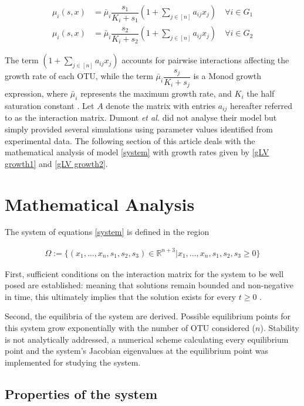 \documentclass[3p,times]{article}
\newcommand{\R}{\mathbb{R}}
\begin{document}
\begin{align}
\label{gLV growth1}\mu_i(s,x) &= \bar{\mu}_i \dfrac{s_1}{K_i + s_1}\left(1+\sum \limits_{j\in [n]} a_{ij} x_{j} \right) \quad \forall i \in G_1 \\
\label{gLV growth2}\mu_i(s,x) &= \bar{\mu}_i \dfrac{s_2}{K_i + s_2}\left(1+\sum \limits_{j\in [n]} a_{ij} x_{j} \right) \quad \forall i \in G_2 
\end{align}

The term $\left(1+\sum \limits_{j\in [n]} a_{ij} x_{j} \right)$ accounts for pairwise interactions affecting the growth rate of each OTU, while the term $\bar{\mu}_i\dfrac{s_j}{K_i + s_j}$ is a Monod growth expression, where $\bar{\mu}_i$ represents the maximum growth rate, and $K_i$ the half saturation constant \cite{monod1942recherches}. Let $A$ denote the matrix
with entries $a_{ij}$ hereafter referred to as the interaction matrix. Dumont\textit{ et al.} did not analyse their model but simply provided several simulations using parameter values identified from experimental data. The following section of this article deals with the mathematical analysis of model \eqref{system} with growth rates given by \eqref{gLV growth1} and \eqref{gLV growth2}.

\section{Mathematical Analysis}

The system of equations \eqref{system} is defined in the region 

\begin{align*}
\Omega := \{ (x_1,\dots,x_n,s_1,s_2,s_3)\in  \R^{n+3} | x_1,\dots,x_n,s_1,s_2,s_3  \geq 0  \}
\end{align*}

First, sufficient conditions on the interaction matrix for the system to be well posed are established: meaning that solutions remain bounded and non-negative in time, this ultimately implies that the solution exists for every $t \geq 0$ \cite{Khalil1996}. 

Second, the equilibria of the system are derived. Possible equilibrium points for this system grow exponentially with the number of OTU considered ($n$).  Stability is not analytically addressed, a numerical scheme calculating every equilibrium point and the system's Jacobian eigenvalues at the equilibrium point was implemented for studying the system. 


\subsection{Properties of the system}
\end{document}
